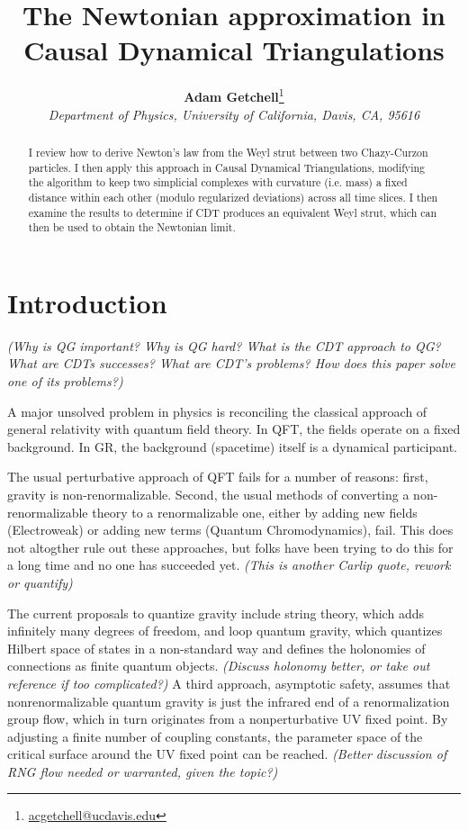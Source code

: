 \documentclass[12pt]{article}
\title{The Newtonian approximation in Causal Dynamical Triangulations}
\author{\textbf{Adam Getchell}\footnote{\href{mailto:acgetchell@ucdavis.edu}{acgetchell@ucdavis.edu}}\\\textit{Department of Physics, University of California, Davis, CA, 95616}}
\begin{document}
\maketitle

\begin{abstract}
I review how to derive Newton's law from the Weyl strut between two Chazy-Curzon particles. I then apply this approach in Causal Dynamical Triangulations, modifying the algorithm to keep two simplicial complexes with curvature (i.e. mass) a fixed distance within each other (modulo regularized deviations) across all time slices. I then examine the results to determine if CDT produces an equivalent Weyl strut, which can then be used to obtain the Newtonian limit.
\end{abstract}

\section{Introduction}

\textit{(Why is QG important? Why is QG hard? What is the CDT approach to QG? What are CDTs successes? What are CDT's problems? How does this paper solve one of its problems?)}

A major unsolved problem in physics is reconciling the classical approach of general relativity with quantum field theory. In QFT, the fields operate on a fixed background. In GR, the background (spacetime) itself is a dynamical participant.

The usual perturbative approach of QFT fails for a number of reasons: first, gravity is non-renormalizable. Second, the usual methods of converting a non-renormalizable theory to a renormalizable one, either by adding new fields (Electroweak) or adding new terms (Quantum Chromodynamics), fail. This does not altogther rule out these approaches, but folks have been trying to do this for a long time and no one has succeeded yet. \textit{(This is another Carlip quote, rework or quantify)}

The current proposals to quantize gravity include string theory, which adds infinitely many degrees of freedom, and loop quantum gravity, which quantizes Hilbert space of states in a non-standard way and defines the holonomies of connections as finite quantum objects. \textit{(Discuss holonomy better, or take out reference if too complicated?)} A third approach, asymptotic safety, assumes that nonrenormalizable quantum gravity is just the infrared end of a renormalization group flow, which in turn originates from a nonperturbative UV fixed point. By adjusting a finite number of coupling constants, the parameter space of the critical surface around the UV fixed point can be reached. \textit{(Better discussion of RNG flow needed or warranted, given the topic?)}
\end{document}
